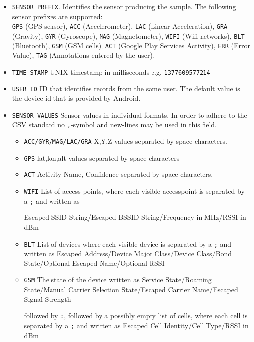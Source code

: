 \begin{itemize}
\item \texttt{SENSOR PREFIX}. Identifies the sensor producing the
  sample. The following sensor prefixes are supported: \\
  \texttt{GPS} (GPS sensor), \texttt{ACC} (Accelerometer),
  \texttt{LAC} (Linear Acceleration), \texttt{GRA} (Gravity),
  \texttt{GYR} (Gyroscope), \texttt{MAG} (Magnetometer), \texttt{WIFI}
  (Wifi networks), \texttt{BLT} (Bluetooth), \texttt{GSM} (GSM cells),
  \texttt{ACT} (Google Play Services Activity), \texttt{ERR} (Error
  Value), \texttt{TAG} (Annotations entered by the user).
\item \texttt{TIME STAMP} UNIX timestamp in milliseconds e.g. \texttt{1377609577214}
\item \texttt{USER ID} ID that identifies records from the same
  user. The default value is the device-id that is provided by
  Android.
\item \texttt{SENSOR VALUES} 
  Sensor values in individual formats. In order to adhere to the CSV
  standard no \texttt{,}-symbol and new-lines may be used in this field.
  \begin{itemize}
  \item \texttt{ACC/GYR/MAG/LAC/GRA} X,Y,Z-values separated by space characters.
  \item \texttt{GPS} lat,lon,alt-values separated by space characters
  \item \texttt{ACT} Activity Name, Confidence separated by space characters.
  \item \texttt{WIFI} List of access-points, where each visible
    accesspoint is separated by a \texttt{;} and written as

    Escaped SSID String/Escaped BSSID String/Frequency in MHz/RSSI in dBm
  \item \texttt{BLT}
    List of devices where each visible device is separated by a \texttt{;}
    and written as
    Escaped Address/Device Major Class/Device Class/Bond
    State/Optional Escaped Name/Optional RSSI
  \item \texttt{GSM}
    The state of the device written as Service State/Roaming State/Manual
    Carrier Selection State/Escaped Carrier Name/Escaped Signal Strength

    followed by \texttt{:}, followed by a possibly empty list of cells,
    where each cell is separated by a \texttt{;} and written as
    Escaped Cell Identity/Cell Type/RSSI in dBm
  \end{itemize}
\end{itemize}

